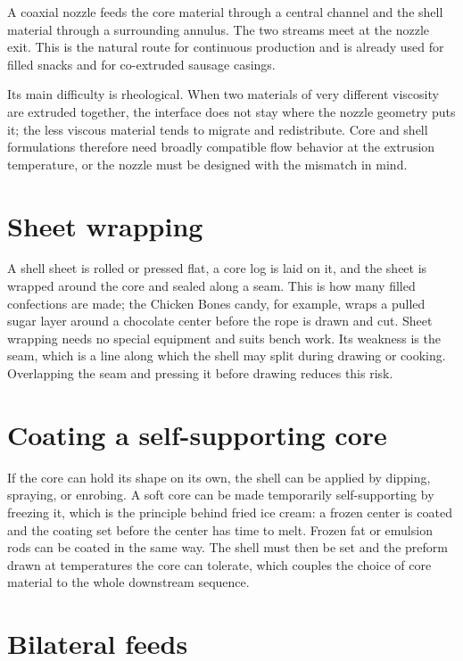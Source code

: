 \documentclass[11pt,openany]{book}
\theoremstyle{definition}
\begin{document}
A coaxial nozzle feeds the core material through a central channel and the shell material through a surrounding annulus. The two streams meet at the nozzle exit. This is the natural route for continuous production and is already used for filled snacks and for co-extruded sausage casings.

Its main difficulty is rheological. When two materials of very different viscosity are extruded together, the interface does not stay where the nozzle geometry puts it; the less viscous material tends to migrate and redistribute. Core and shell formulations therefore need broadly compatible flow behavior at the extrusion temperature, or the nozzle must be designed with the mismatch in mind.

\section{Sheet wrapping}

A shell sheet is rolled or pressed flat, a core log is laid on it, and the sheet is wrapped around the core and sealed along a seam. This is how many filled confections are made; the Chicken Bones candy, for example, wraps a pulled sugar layer around a chocolate center before the rope is drawn and cut. Sheet wrapping needs no special equipment and suits bench work. Its weakness is the seam, which is a line along which the shell may split during drawing or cooking. Overlapping the seam and pressing it before drawing reduces this risk.

\section{Coating a self-supporting core}

If the core can hold its shape on its own, the shell can be applied by dipping, spraying, or enrobing. A soft core can be made temporarily self-supporting by freezing it, which is the principle behind fried ice cream: a frozen center is coated and the coating set before the center has time to melt. Frozen fat or emulsion rods can be coated in the same way. The shell must then be set and the preform drawn at temperatures the core can tolerate, which couples the choice of core material to the whole downstream sequence.

\section{Bilateral feeds}
\end{document}
